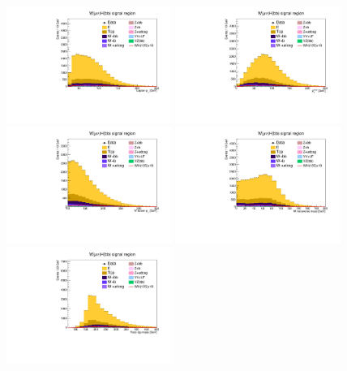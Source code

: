 \begin{figure}[tbp]
  \begin{center}
    \includegraphics[width=0.48\textwidth]{figures/wlnhbb2016/resolved/WmnWHSR_lepton1Pt.pdf}
    \includegraphics[width=0.48\textwidth]{figures/wlnhbb2016/resolved/WmnWHSR_pfmet.pdf}
    \includegraphics[width=0.48\textwidth]{figures/wlnhbb2016/resolved/WmnWHSR_WpT.pdf}
    \includegraphics[width=0.48\textwidth]{figures/wlnhbb2016/resolved/WmnWHSR_mTW.pdf}
    \includegraphics[width=0.48\textwidth]{figures/wlnhbb2016/resolved/WmnWHSR_topMassLep1Met.pdf}

\end{center}
\end{figure}
